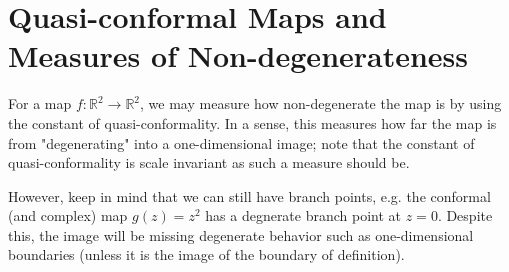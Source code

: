 \section{Quasi-conformal Maps and Measures of Non-degenerateness}

For a map \(f: \mathbb R^2 \to \mathbb R^2\), we may measure how non-degenerate the map is by using the 
constant of quasi-conformality. In a sense, this measures how far the map is from "degenerating" into a
one-dimensional image; note that the constant of quasi-conformality is scale invariant as such a measure
should be.

However, keep in mind that we can still have branch points, e.g. the conformal (and complex) map \(g(z) = z^2\)
has a degnerate branch point at \(z = 0\). Despite this, the image will be missing degenerate behavior such as 
one-dimensional boundaries (unless it is the image of the boundary of definition).
